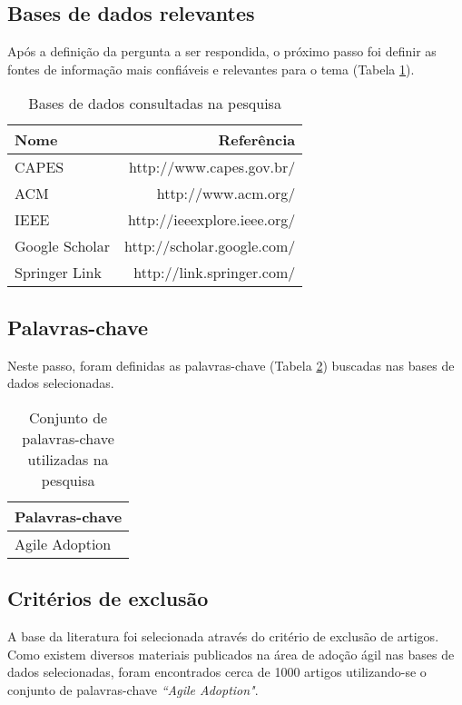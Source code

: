 		\subsection{Bases de dados relevantes}
			Após a definição da pergunta a ser respondida, o próximo passo foi definir as fontes de informação mais confiáveis e relevantes para o tema (Tabela \ref{tab:basesDeDados}).
			\begin{table}[H]
				\centering
				\begin{tabular}{| l | r |} \hline \textbf{Nome} & \textbf{Referência} \\ \hline
					CAPES & http://www.capes.gov.br/ \\ \hline
					ACM & http://www.acm.org/ \\ \hline
					IEEE & http://ieeexplore.ieee.org/ \\ \hline
					Google Scholar & http://scholar.google.com/ \\ \hline
					Springer Link & http://link.springer.com/ \\ \hline
				\end{tabular}
				\caption{Bases de dados consultadas na pesquisa}
				\label{tab:basesDeDados}
			\end{table}
		\subsection{Palavras-chave}
			Neste passo, foram definidas as palavras-chave (Tabela \ref{tab:palavrasChave}) buscadas nas bases de dados selecionadas.
			\begin{table}[H]
				\centering
				\begin{tabular}{| l |} \hline \textbf{Palavras-chave} \\ \hline
					Agile Adoption \\ \hline
				\end{tabular}
				\caption{Conjunto de palavras-chave utilizadas na pesquisa}
				\label{tab:palavrasChave}
			\end{table}
		\subsection{Critérios de exclusão}
			A base da literatura foi selecionada através do critério de exclusão de artigos. Como existem diversos materiais publicados na área de adoção ágil nas bases de dados selecionadas, foram encontrados cerca de 1000 artigos utilizando-se o conjunto de palavras-chave \textit{``Agile Adoption"}.

